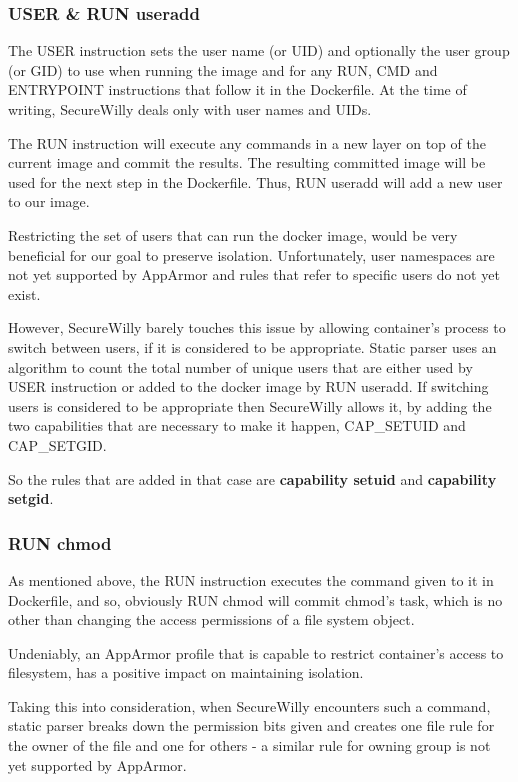 \subsubsection{USER \& RUN useradd}
The USER instruction sets the user name (or UID) and optionally the user group (or GID) to use when running the image and for any RUN, CMD and ENTRYPOINT instructions that follow it in the Dockerfile. At the time of writing, SecureWilly deals only with user names and UIDs.

The RUN instruction will execute any commands in a new layer on top of the current image and commit the results. The resulting committed image will be used for the next step in the Dockerfile. Thus, RUN useradd will add a new user to our image.

Restricting the set of users that can run the docker image, would be very beneficial for our goal to preserve isolation. Unfortunately, user namespaces are not yet supported by AppArmor and rules that refer to specific users do not yet exist.
  
However, SecureWilly barely touches this issue by allowing container's process to switch between users, if it is considered to be appropriate. Static parser uses an algorithm to count the total number of unique users that are either used by USER instruction or added to the docker image by RUN useradd. If switching users is considered to be appropriate then SecureWilly allows it, by adding the two capabilities that are necessary to make it happen, CAP\_SETUID and CAP\_SETGID.

So the rules that are added in that case are \textbf{capability setuid} and \textbf{capability setgid}.
\subsubsection{RUN chmod}

As mentioned above, the RUN instruction executes the command given to it in Dockerfile, and so, obviously RUN chmod will commit chmod's task, which is no other than changing the access permissions of a file system object.

Undeniably, an AppArmor profile that is capable to restrict container's access to filesystem, has a positive impact on maintaining isolation.

Taking this into consideration, when SecureWilly encounters such a command,  static parser breaks down the permission bits given and creates one file rule for the owner of the file and one for others - a similar rule for owning group is not yet supported by AppArmor.

